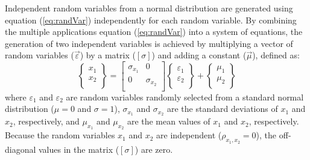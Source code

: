 \documentclass[12pt,oneside]{book}
\begin{document}
Independent random variables from a normal distribution are generated using equation
(\ref{eq:randVar}) independently for each random variable. By combining the multiple applications
equation (\ref{eq:randVar}) into a system of equations, the generation of two independent variables
is achieved by multiplying a vector of random variables ($\vec{\varepsilon}$) by a matrix
($[\sigma]$) and adding a constant ($\vec{\mu}$), defined as:
\begin{equation}
    \left\{
        \begin{array}{c}
            x_1 \\
            x_2 \\
        \end{array}
    \right\}
    =
    \left[
        \begin{array}{ccc}
            \sigma_{x_1} & 0 \\
            0 & \sigma_{x_2} \\
        \end{array}
    \right]
    \left\{
        \begin{array}{c}
            \varepsilon_1 \\
            \varepsilon_2 \\
        \end{array}
    \right\}
    +
    \left\{
        \begin{array}{c}
            \mu_1 \\
            \mu_2 \\
        \end{array}
    \right\}
    \label{eq:linearSystem:uncorrel}
\end{equation}
where $\varepsilon_1$ and $\varepsilon_2$ are random variables randomly selected from a standard
normal distribution ($\mu=0$ and $\sigma=1$), $\sigma_{x_1}$ and $\sigma_{x_2}$ are the standard
deviations of $x_1$ and $x_2$, respectively, and $\mu_{x_1}$ and $\mu_{x_2}$ are the mean values of
$x_1$ and $x_2$, respectively.  Because the random variables $x_1$ and $x_2$ are independent
($\rho_{x_1,x_2}=0$), the off-diagonal values in the matrix ($[\sigma]$) are zero.
\end{document}

